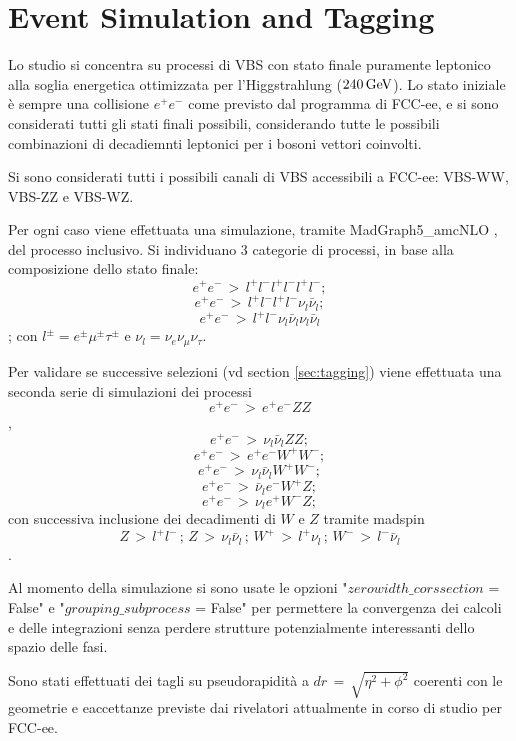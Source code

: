\chapter{Event Simulation and Tagging}
\label{ch:simulation}

Lo studio si concentra su processi di VBS con stato finale puramente leptonico alla soglia energetica ottimizzata per l'Higgstrahlung ($240\,\mathrm{GeV}$). Lo stato iniziale è sempre una collisione $e^+e^-$ come previsto dal programma di FCC-ee, e si sono considerati tutti gli stati finali possibili, considerando tutte le possibili combinazioni di decadiemnti leptonici per i bosoni vettori coinvolti.

Si sono considerati tutti i possibili canali di VBS accessibili a FCC-ee: VBS-WW, VBS-ZZ e VBS-WZ. 

Per ogni caso viene effettuata una simulazione, tramite MadGraph5\_amcNLO , del processo inclusivo. Si individuano 3 categorie di processi, in base alla composizione dello stato finale: $$e^+e^-\,>\,l^+l^-l^+l^-l^+l^-;$$ $$e^+e^-\,>\,l^+l^-l^+l^-\nu_l\bar \nu_l;$$ $$e^+e^-\,>\,l^+l^-\nu_l\bar \nu_l\nu_l\bar \nu_l$$; con $l^\pm = e^\pm \mu^\pm \tau^\pm$ e $\nu_l = \nu_e \nu_\mu \nu_\tau$.


Per validare se successive selezioni (vd section \ref{sec:tagging}) viene effettuata una seconda serie di simulazioni dei processi $$e^+e^-\,>\,e^+e^-ZZ$$, $$e^+e^-\,>\,\nu_l\bar \nu_lZZ;$$ $$e^+e^-\,>\,e^+e^-W^+W^-;$$ $$e^+e^-\,>\,\nu_l\bar \nu_lW^+W^-;$$ $$e^+e^-\,>\,\bar \nu_le^-W^+Z;$$ $$e^+e^-\,>\,\nu_le^+W^-Z;$$ con successiva inclusione dei decadimenti di $W$ e $Z$ tramite madspin $$Z\,>\,l^+l^-\,;\,Z\,>\,\nu_l\bar \nu_l\,;\,W^+\,>\,l^+\nu_l\,;\,W^-\,>\,l^-\bar \nu_l$$.

Al momento della simulazione si sono usate le opzioni "$zerowidth\_corssection$ = False" e "$grouping\_subprocess$ = False" per permettere la convergenza dei calcoli e delle integrazioni senza perdere strutture potenzialmente interessanti dello spazio delle fasi.

Sono stati effettuati dei tagli su pseudorapidità a $dr\,=\,\sqrt{\eta^2+\phi^2}$ coerenti con le geometrie e eaccettanze previste dai rivelatori attualmente in corso di studio per FCC-ee.

